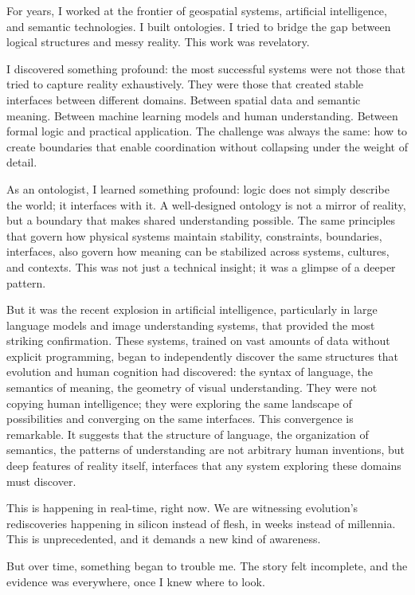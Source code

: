 \documentclass[
  openright]{book}
\begin{document}
For years, I worked at the frontier of geospatial systems, artificial
intelligence, and semantic technologies. I built ontologies. I tried to
bridge the gap between logical structures and messy reality. This work
was revelatory.

I discovered something profound: the most successful systems were not
those that tried to capture reality exhaustively. They were those that
created stable interfaces between different domains. Between spatial
data and semantic meaning. Between machine learning models and human
understanding. Between formal logic and practical application. The
challenge was always the same: how to create boundaries that enable
coordination without collapsing under the weight of detail.

As an ontologist, I learned something profound: logic does not simply
describe the world; it interfaces with it. A well-designed ontology is
not a mirror of reality, but a boundary that makes shared understanding
possible. The same principles that govern how physical systems maintain
stability, constraints, boundaries, interfaces, also govern how meaning
can be stabilized across systems, cultures, and contexts. This was not
just a technical insight; it was a glimpse of a deeper pattern.

But it was the recent explosion in artificial intelligence, particularly
in large language models and image understanding systems, that provided
the most striking confirmation. These systems, trained on vast amounts
of data without explicit programming, began to independently discover
the same structures that evolution and human cognition had discovered:
the syntax of language, the semantics of meaning, the geometry of visual
understanding. They were not copying human intelligence; they were
exploring the same landscape of possibilities and converging on the same
interfaces. This convergence is remarkable. It suggests that the
structure of language, the organization of semantics, the patterns of
understanding are not arbitrary human inventions, but deep features of
reality itself, interfaces that any system exploring these domains must
discover.

This is happening in real-time, right now. We are witnessing evolution's
rediscoveries happening in silicon instead of flesh, in weeks instead of
millennia. This is unprecedented, and it demands a new kind of
awareness.

But over time, something began to trouble me. The story felt incomplete,
and the evidence was everywhere, once I knew where to look.
\end{document}
